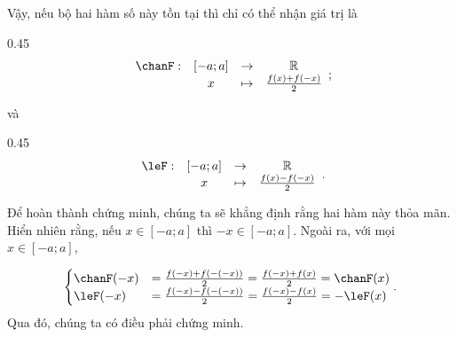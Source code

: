 Vậy, nếu bộ hai hàm số này tồn tại thì chỉ có thể nhận giá trị là

{
   \begin{minipageindent}{0.45\textwidth}
      \begin{equation*}
         \begin{array}{rccc}
            \chanF: &[-a; a] &\to &\mathbb{R} \\
            &x &\mapsto &\frac{f(x) + f(-x)}{2}
         \end{array};
      \end{equation*}
   \end{minipageindent}
   và 
   \begin{minipageindent}{0.45\textwidth}
      \begin{equation*}
         \begin{array}{rccc}
            \leF: &[-a; a] &\to &\mathbb{R} \\
            &x &\mapsto &\frac{f(x) - f(-x)}{2}
         \end{array}.
      \end{equation*}
   \end{minipageindent}
}

Để hoàn thành chứng minh, chúng ta sẽ khẳng định rằng hai hàm này thỏa mãn. Hiển nhiên rằng, nếu $x \in [-a; a]$ thì $-x \in [-a; a]$. Ngoài ra, với mọi $x \in [-a; a]$,

\begin{equation*}
   \begin{cases}
      \chanF(-x) &= \frac{f(-x) + f\left(-(-x)\right)}{2} = \frac{f(-x) + f(x)}{2} = \chanF(x) \\
      \leF(-x) &= \frac{f(-x) - f\left(-(-x)\right)}{2} = \frac{f(-x) - f(x)}{2} = -\leF(x)
   \end{cases}.
\end{equation*}
Qua đó, chúng ta có điều phải chứng minh.